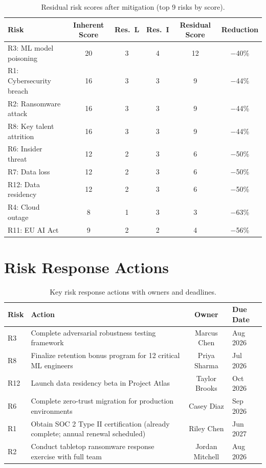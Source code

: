 \documentclass[
    language=english,
    doctype=risk-assessment,
    institution=none,
]{../../omnilatex}
\begin{document}
\begin{table}[h]
    \centering
    \small
    \begin{tabular}{lccccc}
        \toprule
        \textbf{Risk} & \textbf{Inherent Score} & \textbf{Res.\ L} & \textbf{Res.\ I} & \textbf{Residual Score} & \textbf{Reduction} \\
        \midrule
        R3: ML model poisoning  & 20 & 3 & 4 & 12 & $-$40\% \\
        R1: Cybersecurity breach & 16 & 3 & 3 & 9  & $-$44\% \\
        R2: Ransomware attack    & 16 & 3 & 3 & 9  & $-$44\% \\
        R8: Key talent attrition & 16 & 3 & 3 & 9  & $-$44\% \\
        R6: Insider threat       & 12 & 2 & 3 & 6  & $-$50\% \\
        R7: Data loss            & 12 & 2 & 3 & 6  & $-$50\% \\
        R12: Data residency      & 12 & 2 & 3 & 6  & $-$50\% \\
        R4: Cloud outage         &  8 & 1 & 3 & 3  & $-$63\% \\
        R11: EU AI Act           &  9 & 2 & 2 & 4  & $-$56\% \\
        \bottomrule
    \end{tabular}
    \caption{Residual risk scores after mitigation (top 9 risks by score).}
\end{table}

\section{Risk Response Actions}

\begin{table}[h]
    \centering
    \small
    \begin{tabular}{llcl}
        \toprule
        \textbf{Risk} & \textbf{Action} & \textbf{Owner} & \textbf{Due Date} \\
        \midrule
        R3  & Complete adversarial robustness testing framework &
            Marcus Chen & Aug 2026 \\
        R8  & Finalize retention bonus program for 12 critical ML engineers &
            Priya Sharma & Jul 2026 \\
        R12 & Launch data residency beta in Project Atlas &
            Taylor Brooks & Oct 2026 \\
        R6  & Complete zero-trust migration for production environments &
            Casey Diaz & Sep 2026 \\
        R1  & Obtain SOC 2 Type II certification (already complete; annual
            renewal scheduled) &
            Riley Chen & Jun 2027 \\
        R2  & Conduct tabletop ransomware response exercise with full team &
            Jordan Mitchell & Aug 2026 \\
        \bottomrule
    \end{tabular}
    \caption{Key risk response actions with owners and deadlines.}
\end{table}
\end{document}

